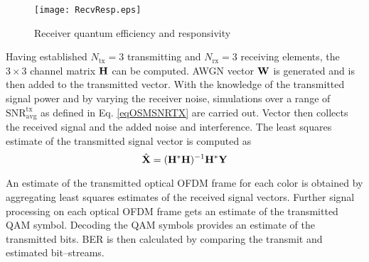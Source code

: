 \begin{figure}[!t]
	\centering
		\texttt{[image: RecvResp.eps]}
	\caption{Receiver quantum efficiency and responsivity}
	\label{fig:RecvResp}
\end{figure}

Having established $N_{\text{tx}} = 3$ transmitting and $N_{\text{rx}} = 3$ receiving elements, the $3\times 3$ channel matrix ${\bf{H}}$ can be computed. AWGN vector ${\bf{W}}$ is generated and is then added to the transmitted vector. With the knowledge of the transmitted signal power and by varying the receiver noise, simulations over a range of $\text{SNR}^{\text{tx}}_{\text{avg}}$ as defined in Eq. \eqref{eqOSMSNRTX} are carried out. Vector  then collects the received signal and the added noise and interference. The least squares estimate of the transmitted signal vector is computed as
\begin{equation}
	\label{eqXhat}
	\hat{{\bf{X}}} = ({\bf{H}}^{*}{\bf{H}})^{-1}{\bf{H}}^{*}{\bf{Y}}
\end{equation}

An estimate of the transmitted optical OFDM frame for each color is obtained by aggregating least squares estimates of the received signal vectors. Further signal processing on each optical OFDM frame gets an estimate of the transmitted QAM symbol. Decoding the QAM symbols provides an estimate of the transmitted bits. BER is then calculated by comparing the transmit and estimated bit--streams.




